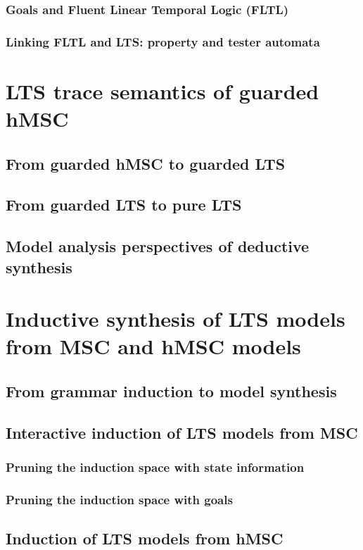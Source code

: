 \documentclass[dvips,a4paper,11pt]{report}
\begin{document}
    \subsection{Goals and Fluent Linear Temporal Logic (FLTL)}
    \subsection{Linking FLTL and LTS: property and tester automata}
\chapter{LTS trace semantics of guarded hMSC}
  \section{From guarded hMSC to guarded LTS}
  \section{From guarded LTS to pure LTS}
  \section{Model analysis perspectives of deductive synthesis}
\chapter{Inductive synthesis of LTS models from MSC and hMSC models\label{chapter:inductive-synthesis}}
  \section{From grammar induction to model synthesis}
  \section{Interactive induction of LTS models from MSC}
    \subsection{Pruning the induction space with state information}
    \subsection{Pruning the induction space with goals}
  \section{Induction of LTS models from hMSC}
\end{document}
